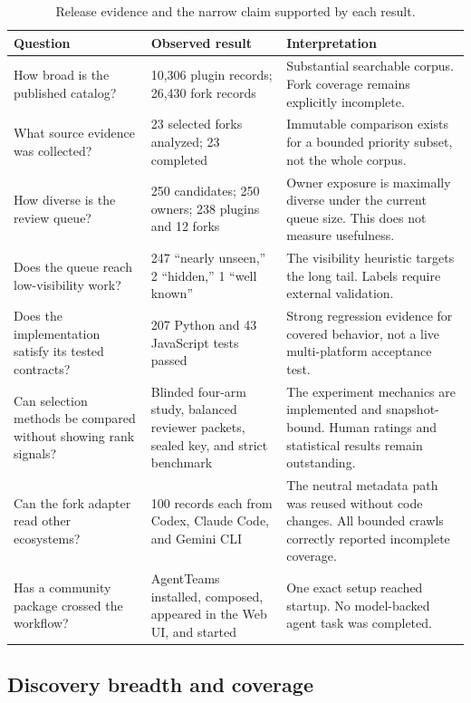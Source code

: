 \documentclass[10pt,twocolumn]{article}
\begin{document}
\begin{table}[t]
\small\renewcommand{\arraystretch}{1.18}
\begin{tabularx}{\linewidth}{L{38mm}L{45mm}Y}
\toprule
\textbf{Question} & \textbf{Observed result} & \textbf{Interpretation}\\
\midrule
How broad is the published catalog? & 10,306 plugin records; 26,430 fork records & Substantial searchable corpus. Fork coverage remains explicitly incomplete.\\
What source evidence was collected? & 23 selected forks analyzed; 23 completed & Immutable comparison exists for a bounded priority subset, not the whole corpus.\\
How diverse is the review queue? & 250 candidates; 250 owners; 238 plugins and 12 forks & Owner exposure is maximally diverse under the current queue size. This does not measure usefulness.\\
Does the queue reach low-visibility work? & 247 ``nearly unseen,'' 2 ``hidden,'' 1 ``well known'' & The visibility heuristic targets the long tail. Labels require external validation.\\
Does the implementation satisfy its tested contracts? & 207 Python and 43 JavaScript tests passed & Strong regression evidence for covered behavior, not a live multi-platform acceptance test.\\
Can selection methods be compared without showing rank signals? & Blinded four-arm study, balanced reviewer packets, sealed key, and strict benchmark & The experiment mechanics are implemented and snapshot-bound. Human ratings and statistical results remain outstanding.\\
Can the fork adapter read other ecosystems? & 100 records each from Codex, Claude Code, and Gemini CLI & The neutral metadata path was reused without code changes. All bounded crawls correctly reported incomplete coverage.\\
Has a community package crossed the workflow? & AgentTeams installed, composed, appeared in the Web UI, and started & One exact setup reached startup. No model-backed agent task was completed.\\
\bottomrule
\end{tabularx}
\caption{Release evidence and the narrow claim supported by each result.\cite{feedrelease,ci,catalogci,agentteams,crossvalidation}}
\label{tab:results}
\end{table}

\subsection{Discovery breadth and coverage}
\end{document}

